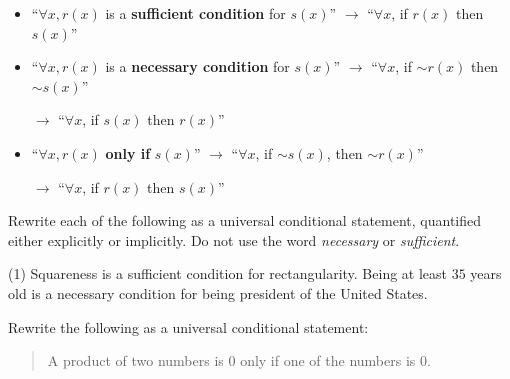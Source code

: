 \documentclass[../mathNotesPreamble]{subfiles}
\begin{document}
  \begin{defn*}
    \TabPositions{105mm}
    \begin{itemize}
      \item ``$\forall x, r(x)$ is a \textbf{sufficient condition} for $s(x)$'' \tab $\rightarrow$ ``$\forall x$, if $r(x)$ then $s(x)$''
        \vspace*{0.5\baselineskip}
      \item ``$\forall x, r(x)$ is a \textbf{necessary condition} for $s(x)$'' \tab $\rightarrow$ ``$\forall x$, if $\sim r(x)$ then $\sim s(x)$''

        \tab $\rightarrow$ ``$\forall x$, if $s(x)$ then $r(x)$''
        \vspace*{0.5\baselineskip}
      \item ``$\forall x, r(x)$ \textbf{only if} $s(x)$'' \tab $\rightarrow$ ``$\forall x$, if $\sim s(x)$, then $\sim r(x)$''

        \tab $\rightarrow$ ``$\forall x$, if $r(x)$ then $s(x)$''
    \end{itemize}
  \end{defn*}
  \begin{ex*}
    Rewrite each of the following as a universal conditional statement, quantified either explicitly or implicitly. Do not use the word \emph{necessary} or \emph{sufficient}.
    \begin{extasks}[after-item-skip=\stretch{1}](1)
      \task Squareness is a sufficient condition for rectangularity.
      \task Being at least $35$ years old is a necessary condition for being president of the United States.
    \end{extasks}
  \end{ex*}
  \begin{ex*}
    Rewrite the following as a universal conditional statement:
    \begin{quote}
      A product of two numbers is $0$ only if one of the numbers is $0$.
    \end{quote}
  \end{ex*}

  \pagebreak
\end{document}
